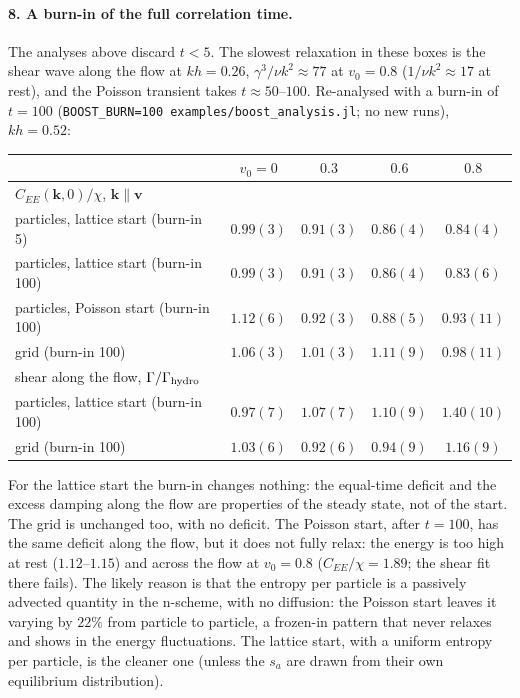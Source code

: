 \documentclass[11pt,aps,preprint,nofootinbib,superscriptaddress,tightenlines]{revtex4-2}
\let\oldparagraph\paragraph
\renewcommand{\paragraph}{\par\bigskip\oldparagraph}
\begin{document}
\paragraph{8. A burn-in of the full correlation time.}  The analyses above discard $t<5$.  The slowest relaxation in
these boxes is the shear wave along the flow at $kh=0.26$, $\gamma^3/\nu k^2\approx77$ at $v_0=0.8$ ($1/\nu k^2\approx17$ at rest), and the
Poisson transient takes $t\approx50$--$100$.  Re-analysed with a burn-in of $t=100$ (\texttt{BOOST\_BURN=100 examples/boost\_analysis.jl};
no new runs), $kh=0.52$:
\begin{center}
\begin{tabular}{lcccc}
\hline
 & $v_0=0$ & $0.3$ & $0.6$ & $0.8$ \\ \hline
\multicolumn{5}{l}{$C_{EE}(\bm k,0)/\chi$, $\bm k\parallel\bm v$} \\
particles, lattice start (burn-in 5) & $0.99(3)$ & $0.91(3)$ & $0.86(4)$ & $0.84(4)$ \\
particles, lattice start (burn-in 100) & $0.99(3)$ & $0.91(3)$ & $0.86(4)$ & $0.83(6)$ \\
particles, Poisson start (burn-in 100) & $1.12(6)$ & $0.92(3)$ & $0.88(5)$ & $0.93(11)$ \\
grid (burn-in 100) & $1.06(3)$ & $1.01(3)$ & $1.11(9)$ & $0.98(11)$ \\
\multicolumn{5}{l}{shear along the flow, $\Gamma/\Gamma_{\rm hydro}$} \\
particles, lattice start (burn-in 100) & $0.97(7)$ & $1.07(7)$ & $1.10(9)$ & $1.40(10)$ \\
grid (burn-in 100) & $1.03(6)$ & $0.92(6)$ & $0.94(9)$ & $1.16(9)$ \\
\hline
\end{tabular}
\end{center}
For the lattice start the burn-in changes nothing: the equal-time deficit and the excess damping along the
flow are properties of the steady state, not of the start.  The grid is unchanged too, with no deficit.  The
Poisson start, after $t=100$, has the same deficit along the flow, but it does not fully relax: the energy is too
high at rest ($1.12$--$1.15$) and across the flow at $v_0=0.8$ ($C_{EE}/\chi=1.89$; the shear fit there fails).  The likely reason
is that the entropy per particle is a passively advected quantity in the n-scheme, with no diffusion: the
Poisson start leaves it varying by $22\%$ from particle to particle, a frozen-in pattern that never relaxes and shows
in the energy fluctuations.  The lattice start, with a uniform entropy per particle, is the cleaner one (unless the
$s_a$ are drawn from their own equilibrium distribution).
\end{document}

